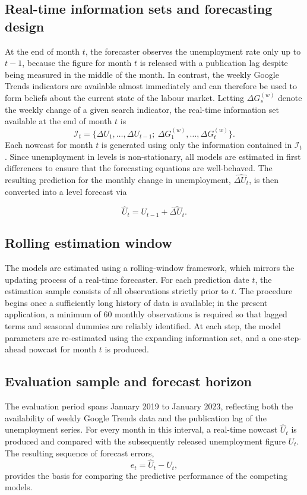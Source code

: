 \documentclass[12pt,a4paper]{article}
\begin{document}
\subsection{Real-time information sets and forecasting design}
At the end of month $t$, the forecaster observes the unemployment rate only up
to $t-1$, because the figure for month $t$ is released with a publication lag
despite being measured in the middle of the month. In contrast, the weekly
Google Trends indicators are available almost immediately and can therefore be
used to form beliefs about the current state of the labour market. Letting
$\Delta G_s^{(w)}$ denote the weekly change of a given search indicator, the
real-time information set available at the end of month $t$ is
\begin{equation}
    \mathcal{I}_t = 
    \{\Delta U_1, \ldots, \Delta U_{t-1};\ 
      \Delta G_1^{(w)}, \ldots, \Delta G_t^{(w)} \}.
\end{equation}
Each nowcast for month $t$ is generated using only the information contained in
$\mathcal{I}_t$. Since unemployment in levels is non-stationary, all models are
estimated in first differences to ensure that the forecasting equations are
well-behaved. The resulting prediction for the monthly change in unemployment,
$\widehat{\Delta U_t}$, is then converted into a level forecast via

\begin{equation}
    \widehat{U}_t = U_{t-1} + \widehat{\Delta U_t}.
\end{equation}
\subsection{Rolling estimation window}
The models are estimated using a rolling-window framework, which mirrors the
updating process of a real-time forecaster. For each prediction date $t$, the
estimation sample consists of all observations strictly prior to $t$. The
procedure begins once a sufficiently long history of data is available; in the
present application, a minimum of 60 monthly observations is required so that
lagged terms and seasonal dummies are reliably identified. At each step, the
model parameters are re-estimated using the expanding information set, and a
one-step-ahead nowcast for month $t$ is produced.
\subsection{Evaluation sample and forecast horizon}
The evaluation period spans January 2019 to January 2023, reflecting both the
availability of weekly Google Trends data and the publication lag of the
unemployment series. For every month in this interval, a real-time nowcast
$\widehat{U}_t$ is produced and compared with the subsequently released
unemployment figure $U_t$. The resulting sequence of forecast errors,
\begin{equation}
    e_t = \widehat{U}_t - U_t,
\end{equation}
provides the basis for comparing the predictive performance of the competing
models.
\end{document}

